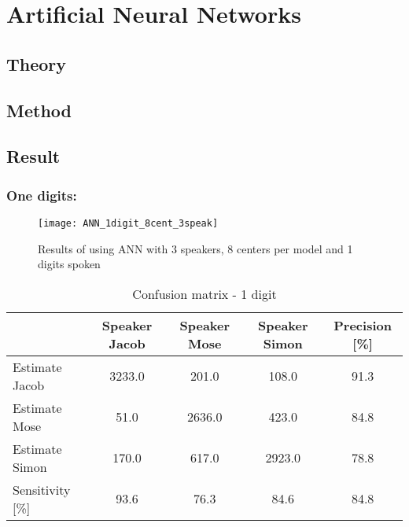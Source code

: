 \chapter{Artificial Neural Networks}

\section{Theory}

\section{Method}

\section{Result}





\subsection{One digits:}
\begin{figure}[H]
\centering
\texttt{[image: ANN\_1digit\_8cent\_3speak]}
\caption{Results of using ANN with 3 speakers, 8 centers per model and 1 digits spoken}
\label{fig:ANN_fig_1}
\end{figure}

\begin{table}[H]                                                    
\centering                                                          
\begin{tabular}{|l|c|c|c|c|}                                        
\hline                                                              
  & Speaker Jacob & Speaker Mose & Speaker Simon & Precision [\%] \\
\hline                                                              
Estimate Jacob & 3233.0 & 201.0 & 108.0 & 91.3 \\                   
\hline                                                              
Estimate Mose & 51.0 & 2636.0 & 423.0 & 84.8 \\                     
\hline                                                              
Estimate Simon & 170.0 & 617.0 & 2923.0 & 78.8 \\                   
\hline                                                              
Sensitivity [\%] & 93.6 & 76.3 & 84.6 & 84.8 \\                     
\hline                                                              
\end{tabular}                                                       
\caption{Confusion matrix - 1 digit}                                
\label{table:ANN_conf_1}                                            
\end{table}  